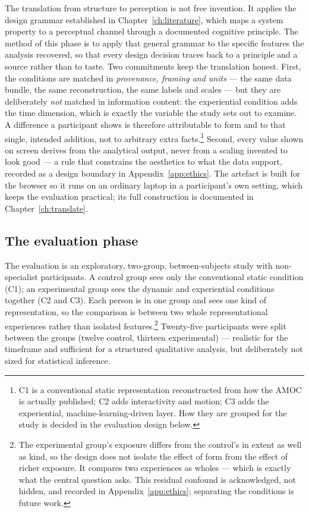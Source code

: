 The translation from structure to perception is not free invention. It applies the design grammar established in Chapter~\ref{ch:literature}, which maps a system property to a perceptual channel through a documented cognitive principle. The method of this phase is to apply that general grammar to the specific features the analysis recovered, so that every design decision traces back to a principle and a source rather than to taste. Two commitments keep the translation honest. First, the conditions are matched in \emph{provenance, framing and units} --- the same data bundle, the same reconstruction, the same labels and scales --- but they are deliberately \emph{not} matched in information content: the experiential condition adds the time dimension, which is exactly the variable the study sets out to examine. A difference a participant shows is therefore attributable to form and to that single, intended addition, not to arbitrary extra facts.\footnote{C1 is a conventional static representation reconstructed from how the AMOC is actually published; C2 adds interactivity and motion; C3 adds the experiential, machine-learning-driven layer. How they are grouped for the study is decided in the evaluation design below.} Second, every value shown on screen derives from the analytical output, never from a scaling invented to look good --- a rule that constrains the aesthetics to what the data support, recorded as a design boundary in Appendix~\ref{app:ethics}. The artefact is built for the browser so it runs on an ordinary laptop in a participant's own setting, which keeps the evaluation practical; its full construction is documented in Chapter~\ref{ch:translate}.

\subsection{The evaluation phase}
\label{subsec:evaluation}

The evaluation is an exploratory, two-group, between-subjects study with non-specialist participants. A control group sees only the conventional static condition (C1); an experimental group sees the dynamic and experiential conditions together (C2 and C3). Each person is in one group and sees one kind of representation, so the comparison is between two whole representational experiences rather than isolated features.\footnote{The experimental group's exposure differs from the control's in extent as well as kind, so the design does not isolate the effect of form from the effect of richer exposure. It compares two experiences as wholes --- which is exactly what the central question asks. This residual confound is acknowledged, not hidden, and recorded in Appendix~\ref{app:ethics}; separating the conditions is future work.} Twenty-five participants were split between the groups (twelve control, thirteen experimental) --- realistic for the timeframe and sufficient for a structured qualitative analysis, but deliberately not sized for statistical inference.

